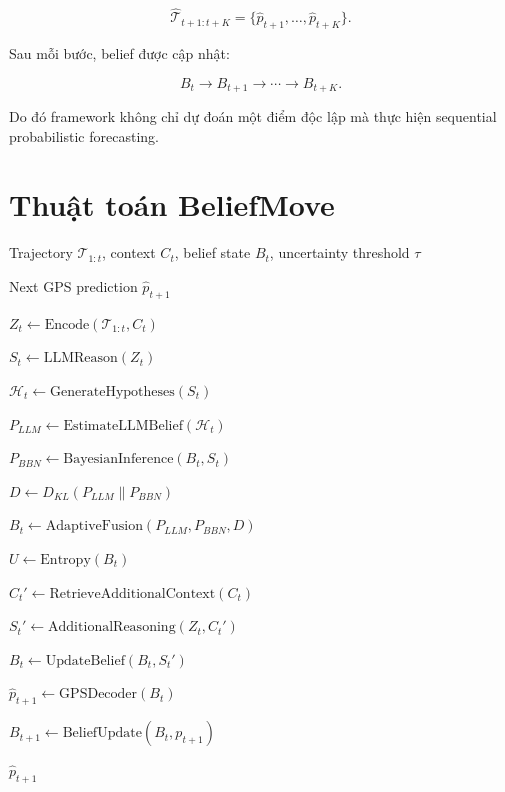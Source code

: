 \documentclass[11pt,a4paper]{article}
\begin{document}
	\begin{equation}
		\hat{\mathcal{T}}_{t+1:t+K}
		=
		\{
		\hat{p}_{t+1},
		\ldots,
		\hat{p}_{t+K}
		\}.
	\end{equation}
	
	Sau mỗi bước, belief được cập nhật:
	
	\begin{equation}
		B_t
		\rightarrow
		B_{t+1}
		\rightarrow
		\cdots
		\rightarrow
		B_{t+K}.
	\end{equation}
	
	Do đó framework không chỉ dự đoán một điểm độc lập mà thực hiện
	sequential probabilistic forecasting.
	
	\section{Thuật toán BeliefMove}
	
	\begin{algorithm}[H]
		\caption{BeliefMove: Bayesian Belief-Augmented Mobility Agent}
		\label{alg:beliefmove}
		
		\begin{algorithmic}[1]
			
			\Require
			Trajectory $\mathcal{T}_{1:t}$,
			context $C_t$,
			belief state $B_t$,
			uncertainty threshold $\tau$
			
			\Ensure
			Next GPS prediction $\hat{p}_{t+1}$
			
			\State
			$Z_t
			\gets
			\mathrm{Encode}
			(\mathcal{T}_{1:t},C_t)$
			
			\State
			$S_t
			\gets
			\mathrm{LLMReason}
			(Z_t)$
			
			\State
			$\mathcal{H}_t
			\gets
			\mathrm{GenerateHypotheses}
			(S_t)$
			
			\State
			$P_{LLM}
			\gets
			\mathrm{EstimateLLMBelief}
			(\mathcal{H}_t)$
			
			\State
			$P_{BBN}
			\gets
			\mathrm{BayesianInference}
			(B_t,S_t)$
			
			\State
			$D
			\gets
			D_{KL}(P_{LLM}\|P_{BBN})$
			
			\State
			$B_t
			\gets
			\mathrm{AdaptiveFusion}
			(P_{LLM},P_{BBN},D)$
			
			\State
			$U
			\gets
			\mathrm{Entropy}(B_t)$
			
			
			\State
			$C_t'
			\gets
			\mathrm{RetrieveAdditionalContext}(C_t)$
			
			\State
			$S_t'
			\gets
			\mathrm{AdditionalReasoning}(Z_t,C_t')$
			
			\State
			$B_t
			\gets
			\mathrm{UpdateBelief}(B_t,S_t')$
			
			\EndIf
			
			\State
			$\hat{p}_{t+1}
			\gets
			\mathrm{GPSDecoder}(B_t)$
			
			\State
			$B_{t+1}
			\gets
			\mathrm{BeliefUpdate}(B_t,p_{t+1})$
			
			\State
			\Return
			$\hat{p}_{t+1}$
			
		\end{algorithmic}
	\end{algorithm}
	
\end{document}
